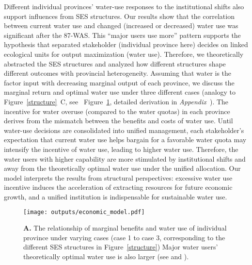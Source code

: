 \label{discussion-2}
Different individual provinces' water-use responses to the institutional shifts also support influences from SES structures.
Our results show that the correlation between current water use and changed (increased or decreased) water use was significant after the 87-WAS.
This ``major users use more'' pattern supports the hypothesis that separated stakeholder (individual province here) decides on linked ecological units for output maximization (water use).
Therefore, we theoretically abstracted the SES structures and analyzed how different structures shape different outcomes with provincial heterogeneity.
Assuming that water is the factor input with decreasing marginal output of each province, we discuss the marginal return and optimal water use under three different cases (analogy to Figure~\ref{structure}~C, see ~Figure~\ref{fig:model}, detailed derivation in \textit{Appendix~}).
The incentive for water overuse (compared to the water quotas) in each province derives from the mismatch between the benefits and costs of water use.
Until water-use decisions are consolidated into unified management, each stakeholder’s expectation that current water use helps bargain for a favorable water quota may intensify the incentive of water use, leading to higher water use.
Therefore, the water users with higher capability are more stimulated by institutional shifts and away from the theoretically optimal water use under the unified allocation.
Our model interprets the results from structural perspectives: excessive water use incentive induces the acceleration of extracting resources for future economic growth, and a unified institution is indispensable for sustainable water use.

\begin{figure}[!ht]
    \centering
    \texttt{[image: outputs/economic\_model.pdf]}
	\caption{
		\textbf{A.} The relationship of marginal benefits and water use of individual province under varying cases (case 1 to case 3, corresponding to the different SES structures in Figure~\ref{structure}) Major water users' theoretically optimal water use is also larger (see  and \textit{}).}
	\label{fig:model}
\end{figure}

